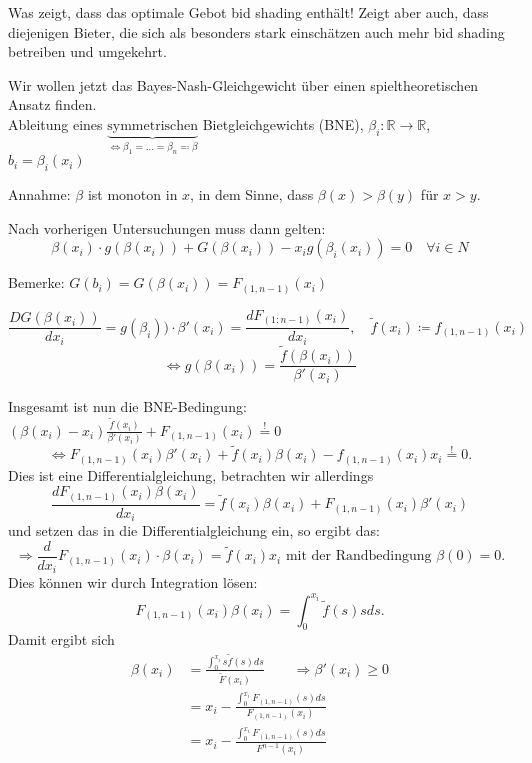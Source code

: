 \documentclass[12pt]{extreport} %
\theoremstyle{named}
\theoremstyle{itshape}
\theoremstyle{normal}
\begin{document}
Was zeigt, dass das optimale Gebot bid shading enthält! Zeigt aber auch, dass diejenigen Bieter, die sich als besonders stark einschätzen auch mehr bid shading betreiben und umgekehrt.

Wir wollen jetzt das Bayes-Nash-Gleichgewicht über einen spieltheoretischen Ansatz finden.  \\

Ableitung eines $\underbrace{\text{symmetrischen}}_{\iff \beta_{1} = \dotsc = \beta_{n} \eqqcolon \beta}$ Bietgleichgewichts (BNE), $\beta_{i} \colon \mathbb{R} \rightarrow \mathbb{R}$, $b_{i} = \beta_{i}(x_{i})$

Annahme: $\beta$ ist monoton in $x$, in dem Sinne, dass $\beta(x) > \beta(y)$ für $x > y$.

Nach vorherigen Untersuchungen muss dann gelten:
$$ \beta(x_i) \cdot g(\beta(x_{i})) + G(\beta(x_{i})) - x_{i} g(\beta_{i}(x_{i})) = 0 \quad \forall i \in N $$

Bemerke: $G(b_{i}) = G(\beta(x_{i})) = F_{(1,n-1)}(x_{i})$

$$ \frac{D G(\beta(x_{i}))}{d x_{i}} = g(\beta_{i})) \cdot \beta'(x_{i}) = \frac{d F_{(1:n-1)}(x_{i})}{dx_{i}}, \quad \tilde{f}(x_{i}) \coloneqq f_{(1, n-1)}(x_{i}) $$
$$ \iff g(\beta(x_{i})) = \frac{\tilde{f}(\beta(x_{i}))}{\beta'(x_{i})} $$

Insgesamt ist nun die BNE-Bedingung: $(\beta(x_{i}) - x_{i}) \frac{\tilde{f}(x_{i})}{\beta'(x_{i})} + F_{(1,n-1)}(x_{i}) \overset{!}{=} 0$
$$ \iff F_{(1, n-1)}(x_{i}) \beta'(x_{i}) + \tilde{f}(x_{i}) \beta(x_{i}) - f_{(1, n-1)}(x_{i}) x_{i} \overset{!}{=} 0. $$
Dies ist eine Differentialgleichung, betrachten wir allerdings
$$ \frac{d F_{(1,n-1)}(x_{i}) \beta(x_{i})}{d x_{i}} = \tilde{f}(x_{i}) \beta(x_{i}) + F_{(1, n-1)}(x_{i}) \beta'(x_{i}) $$
und setzen das in die Differentialgleichung ein, so ergibt das:
$$ \Rightarrow \frac{d}{dx_{i}} F_{(1,n-1)}(x_{i}) \cdot \beta(x_{i}) = \tilde{f}(x_{i}) x_{i} \text{ mit der Randbedingung } \beta(0) = 0. $$
Dies können wir durch Integration lösen:
$$ F_{(1, n-1)}(x_{i}) \beta(x_{i}) = \int_{0}^{x_{i}} \tilde{f}(s) s ds. $$
Damit ergibt sich
\begin{align*}
	\beta(x_{i}) & = \frac{\int_{0}^{x_{i}} s \tilde{f}(s) ds}{\tilde{F}(x_{i})} \qquad \Rightarrow \beta'(x_{i}) \geq 0 \\
	& = x_{i} - \frac{\int_{0}^{x_{i}} F_{(1, n-1)}(s) ds}{F_{(1,n-1)}(x_{i})} \\
	& = x_{i} - \frac{\int_{0}^{x_{i}} F_{(1,n-1)}(s) ds}{F^{n-1}(x_{i})} 
\end{align*}
\end{document}
